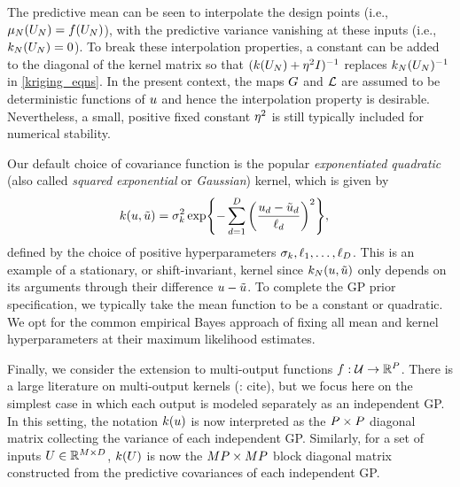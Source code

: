 \documentclass[12pt]{article}
\begin{document}
The predictive mean can be seen to interpolate the design points (i.e., $\gpMean[\Ndesign](\designIn) = \func(\designIn)$), with 
the predictive variance vanishing at these inputs (i.e., $\gpKer[\Ndesign](\designIn) = 0$). To break these interpolation properties,
a constant can be added to the diagonal of the kernel matrix so that $(\gpKerPrior(\designIn) + \nuggetSD^2 I)^{-1}$ replaces 
$\gpKer(\designIn)^{-1}$ in \ref{kriging_eqns}. In the present context, the maps $\fwd$ and $\llik$ are assumed to be deterministic functions 
of $\Par$ and hence the interpolation property is desirable. Nevertheless, a small, positive fixed constant $\nuggetSD^2$ is still 
typically included for numerical stability. 

Our default choice of covariance function is the popular \textit{exponentiated quadratic} 
(also called \textit{squared exponential} or \textit{Gaussian}) kernel, which is given by 
\begin{align}
\gpKerPrior(\Par, \tilde{\Par}) &= 
\margSD^2 \Exp{- \sum_{\idxParDim=1}^{\dimPar} \left(\frac{\Par_{\idxParDim} - \tilde{\Par}_{\idxParDim}}{\lengthscale_{\idxParDim}} \right)^2}, 
\end{align}
defined by the choice of positive hyperparameters $\margSD, \lengthscale_{1}, \dots, \lengthscale_{\dimPar}$. This is an example
of a stationary, or shift-invariant, kernel since $\gpKer(\Par, \tilde{\Par})$ only depends on its arguments through their difference 
$\Par - \tilde{\Par}$. To complete the GP prior specification, we typically take the mean 
function to be a constant or quadratic. We opt for the common empirical Bayes approach of fixing all mean and kernel hyperparameters 
at their maximum likelihood estimates. 

Finally, we consider the extension to multi-output functions $\func: \parSpace \to \R^{\dimObs}$. There is a large literature on multi-output 
kernels (\todo: cite), but we focus here on the simplest case in which each output is modeled separately as an independent GP. 
In this setting, the notation $\gpKerPrior(\Par)$ is now interpreted as the $\dimObs \times \dimObs$ diagonal matrix collecting the variance of each 
independent GP. Similarly, for a set of inputs $\parMat \in \R^{M \times \dimPar}$, $\gpKerPrior(\parMat)$ is now the 
$M\dimObs \times M\dimObs$ block diagonal matrix constructed from the predictive covariances of each independent GP. 
\end{document}

